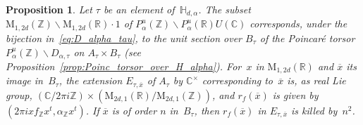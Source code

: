 \documentclass[11pt]{article}
\providecommand{\C}{}
\theoremstyle{plain}
\newtheorem{Proposition}[subsection]{Proposition}
\theoremstyle{definition}
\numberwithin{equation}{subsection}
\let\ol\overline
\renewcommand{\C}{\mathbb C}
\newcommand{\R}{\mathbb R}
\newcommand{\Z}{\mathbb Z}
\renewcommand{\H}{\mathbb H}
\newcommand{\rmM}{\mathrm{M}}
\begin{document}
\begin{Proposition}\label{prop_tors_prop_r_f_msv}
Let $\tau$ be an element of~$\H_{d,\alpha}$. The subset
$\rmM_{1,2d}(\Z)\backslash\rmM_{1,2d}(\R){\cdot}1$ of
$P_\alpha^u(\Z)\backslash P_\alpha^u(\R)U(\C)$ corresponds, under
the bijection in~\eqref{eq:D_alpha_tau}, to the unit section over
$B_\tau$ of the Poincaré torsor $P_\alpha^u(\Z)\backslash
D_{\alpha,\tau}$ on $A_\tau\times B_\tau$ (see
Proposition~\ref{prop:Poinc_torsor_over_H_alpha}).
For~$x$ in $\rmM_{1,2d}(\R)$ and
$\ol{x}$ its image in~$B_\tau$, the extension $E_{\tau,\ol{x}}$ of
$A_\tau$ by $\C^\times$ corresponding to~$\ol{x}$ is,
as real Lie group, $(\C/2\pi i\Z)\times(\rmM_{2d,1}(\R)/\rmM_{2d,1}(\Z))$,
and $r_f(\ol{x})$ is given by $(2\pi ixf_\Z x^t, \alpha_\Z x^t)$. If $\ol{x}$ is of
order $n$ in~$B_\tau$, then $r_f(\ol{x})$ in $E_{\tau,\ol{x}}$ is killed by~$n^2$.
\end{Proposition}
\end{document}
